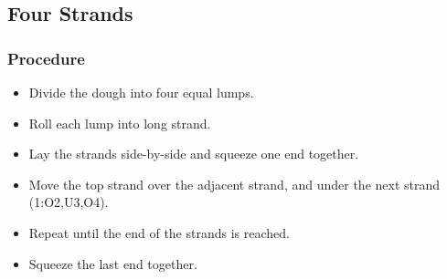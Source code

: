 \documentclass[10pt, openany]{book}
\begin{document}
\subsection{Four Strands}
\subsubsection{Procedure}
\begin{itemize}
  \item Divide the dough into four equal lumps.
  \item Roll each lump into long strand.
  \item Lay the strands side-by-side and squeeze one end together.
  \item Move the top strand over the adjacent strand, and under the next strand (1:O2,U3,O4).
  \item Repeat until the end of the strands is reached.
  \item Squeeze the last end together.
\end{itemize}
\end{document}
